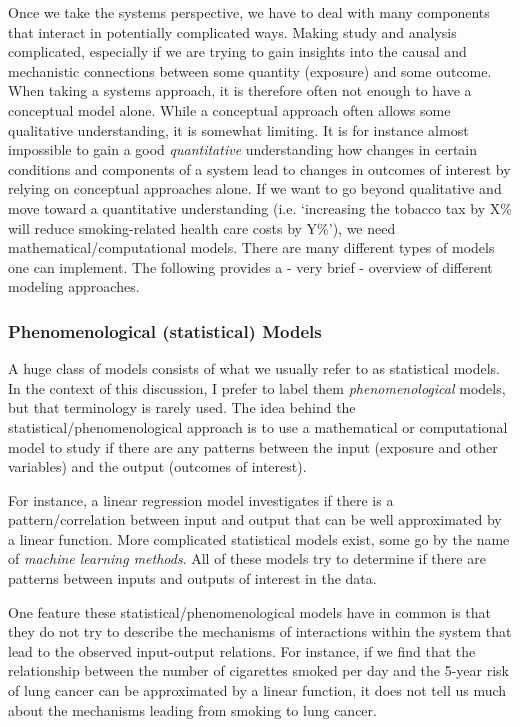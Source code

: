 \documentclass[]{article}
\theoremstyle{definition}
\theoremstyle{definition}
\theoremstyle{definition}
\theoremstyle{remark}
\begin{document}
Once we take the systems perspective, we have to deal with many
components that interact in potentially complicated ways. Making study
and analysis complicated, especially if we are trying to gain insights
into the causal and mechanistic connections between some quantity
(exposure) and some outcome. When taking a systems approach, it is
therefore often not enough to have a conceptual model alone. While a
conceptual approach often allows some qualitative understanding, it is
somewhat limiting. It is for instance almost impossible to gain a good
\emph{quantitative} understanding how changes in certain conditions and
components of a system lead to changes in outcomes of interest by
relying on conceptual approaches alone. If we want to go beyond
qualitative and move toward a quantitative understanding (i.e.
`increasing the tobacco tax by X\% will reduce smoking-related health
care costs by Y\%'), we need mathematical/computational models. There
are many different types of models one can implement. The following
provides a - very brief - overview of different modeling approaches.

\subsubsection{Phenomenological (statistical)
Models}\label{phenomenological-statistical-models}

A huge class of models consists of what we usually refer to as
statistical models. In the context of this discussion, I prefer to label
them \emph{phenomenological} models, but that terminology is rarely
used. The idea behind the statistical/phenomenological approach is to
use a mathematical or computational model to study if there are any
patterns between the input (exposure and other variables) and the output
(outcomes of interest).

For instance, a linear regression model investigates if there is a
pattern/correlation between input and output that can be well
approximated by a linear function. More complicated statistical models
exist, some go by the name of \emph{machine learning methods}. All of
these models try to determine if there are patterns between inputs and
outputs of interest in the data.

One feature these statistical/phenomenological models have in common is
that they do not try to describe the mechanisms of interactions within
the system that lead to the observed input-output relations. For
instance, if we find that the relationship between the number of
cigarettes smoked per day and the 5-year risk of lung cancer can be
approximated by a linear function, it does not tell us much about the
mechanisms leading from smoking to lung cancer.
\end{document}
